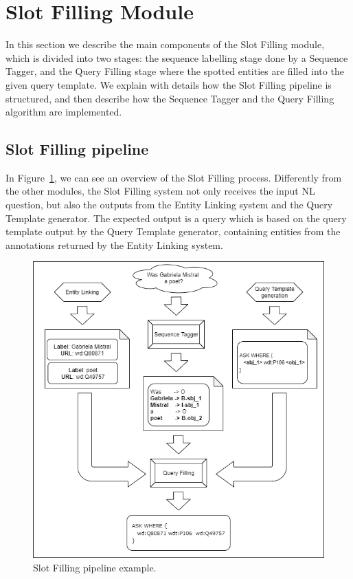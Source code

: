 \section{Slot Filling Module}
\label{cap3:system/slotFillModule}
In this section we describe the main components of the Slot Filling module, which is divided 
into two stages: the sequence labelling stage done by a Sequence Tagger, and the Query 
Filling stage where the spotted entities are filled into the given query template. We explain 
with details how the Slot Filling pipeline is structured, and then describe how the Sequence 
Tagger and the Query Filling algorithm are implemented.

\subsection{Slot Filling pipeline}
\label{cap3:system/slotFillModule/pipeline}
In Figure~\ref{fig:slotFillingPipeline}, we can see an overview of the Slot Filling process. 
Differently from the other modules, the Slot Filling system not only receives the input NL 
question, but also the outputs from the Entity Linking system and the Query Template generator. 
The expected output is a \SPARQL{} query which is based on the query template output by the 
Query Template generator, containing entities from the annotations returned by the Entity 
Linking system.

\begin{figure}[!h]
    \centering
    \includegraphics[scale=.5]{imagenes/3_system_overview/slotFillingPipeline.png}
    \caption{Slot Filling pipeline example.}
    \label{fig:slotFillingPipeline}
\end{figure}

